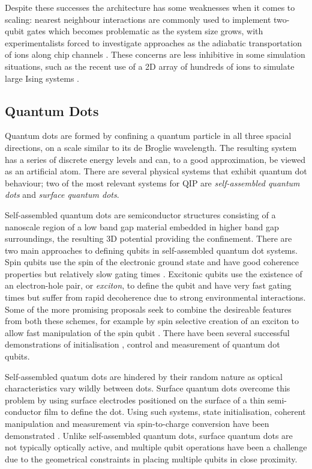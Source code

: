 Despite these successes the architecture has some weaknesses when it comes to scaling: nearest neighbour interactions are commonly used to implement two-qubit gates which becomes problematic as the system size grows, with experimentalists forced to investigate approaches as the adiabatic transportation of ions along chip channels \cite{ion_trap_on_chip}. These concerns are less inhibitive in some simulation situations, such as the recent use of a 2D array of hundreds of ions to simulate large Ising systems \cite{ion_trap_magnetism_simulator}.

\subsection{Quantum Dots}

Quantum dots are formed by confining a quantum particle in all three spacial directions, on a scale similar to its de Broglie wavelength. The resulting system has a series of discrete energy levels and can, to a good approximation, be viewed as an artificial atom. There are several physical systems that exhibit quantum dot behaviour; two of the most relevant systems for QIP are \textit{self-assembled quantum dots} and \textit{surface quantum dots}.

Self-assembled quantum dots are semiconductor structures consisting of a nanoscale region of a low band gap material embedded in higher band gap surroundings, the resulting 3D potential providing the confinement.  There are two main approaches to defining qubits in self-assembled quantum dot systems. Spin qubits use the spin of the electronic ground state and have good coherence properties \cite{Kroutvar:2004p4951, Greilich:2006p5031} but relatively slow gating times \cite{Burkard:1999p5057}. Excitonic qubits use the existence of an electron-hole pair, or \textit{exciton}, to define the qubit and have very fast gating times \cite{Li:2003p5178} but suffer from rapid decoherence due to strong environmental interactions. Some of the more promising proposals seek to combine the desireable features from both these schemes, for example by spin selective creation of an exciton to allow fast manipulation of the spin qubit \cite{Calarco:2003p5363, Chen:2000p5290, Yokoi:2005p5390}. There have been several successful demonstrations of initialisation \cite{atature_quantum_dot_06, gerardot_dot_08}, control \cite{quantum_dot_control_08} and measurement \cite{quantum_dot_measurement_06} of quantum dot qubits.

Self-assembled quatum dots are hindered by their random nature as optical characteristics vary wildly between dots. Surface quantum dots overcome this problem by using surface electrodes positioned on the surface of a thin semi-conductor film to define the dot. Using such systems, state initialisation, coherent manipulation and measurement via spin-to-charge conversion have been demonstrated \cite{quantum_dot_nanowires_example}. Unlike self-assembled quantum dots, surface quantum dots are not typically optically active, and multiple qubit operations have been a challenge due to the geometrical constraints in placing multiple qubits in close proximity.

